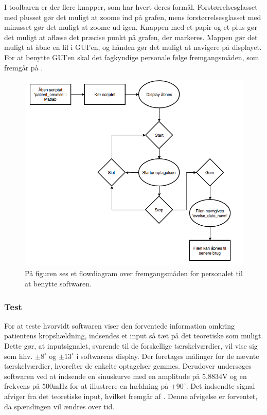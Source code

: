 I toolbaren er der flere knapper, som har hvert deres formål. Forstørrelsesglasset med plusset gør det muligt at zoome ind på grafen, mens forstørrelsesglasset med minusset gør det muligt at zoome ud igen. Knappen med et papir og et plus gør det muligt at aflæse det præcise punkt på grafen, der markeres. Mappen gør det muligt at åbne en fil i GUI'en, og hånden gør det muligt at navigere på displayet.\\
For at benytte GUI'en skal det fagkyndige personale følge fremgangsmåden, som fremgår på .
\begin{figure}[H] 
	\centering 
	\includegraphics[scale=0.5]{figures/cProblemloesning/Software_flowdiagram.PNG}
	\caption{På figuren ses et flowdiagram over fremgangsmåden for personalet til at benytte softwaren.}
	\label{Fig:fremgangsmåde_software}
\end{figure}

\subsubsection{Test}
For at teste hvorvidt softwaren viser den forventede information omkring patientens kropshældning, indsendes et input så tæt på det teoretiske som muligt. Dette gør, at inputsignalet, svarende til de forskellige tærskelværdier, vil vise sig som hhv. $\pm 8^{\circ}$ og $\pm 13^{\circ}$ i softwarens display. Der foretages målinger for de nævnte tærskelværdier, hvorefter de enkelte optagelser gemmes.
Derudover undersøges softwaren ved at indsende en sinuskurve med en amplitude på $5.8834$V og en frekvens på $500$mHz for at illustrere en hældning på $\pm90^{\circ}$. Det indsendte signal afviger fra det teoretiske input, hvilket fremgår af . Denne afvigelse er forventet, da spændingen vil ændres over tid. 


